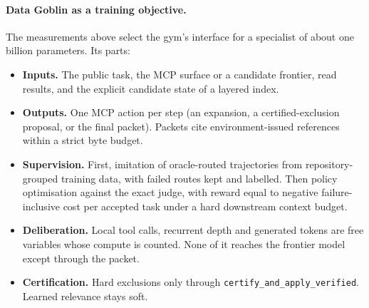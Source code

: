 \paragraph{Data Goblin as a training objective.} The measurements above select the gym's
interface for a specialist of about one billion parameters. Its parts:
\begin{itemize}
\item \textbf{Inputs.} The public task, the MCP surface or a candidate frontier, read results, and the explicit candidate
state of a layered index.
\item \textbf{Outputs.} One MCP action per step (an expansion, a certified-exclusion proposal, or the final packet). Packets cite
environment-issued references within a strict byte budget.
\item \textbf{Supervision.} First, imitation of oracle-routed trajectories from repository-grouped training data, with failed routes
kept and labelled. Then policy optimisation against the exact judge, with reward equal to negative failure-inclusive
cost per accepted task under a hard downstream context budget.
\item \textbf{Deliberation.} Local tool calls, recurrent depth and generated tokens are free variables whose compute is
counted. None of it reaches the frontier model except through the packet.
\item \textbf{Certification.} Hard exclusions only through \texttt{certify\_and\_apply\_verified}. Learned relevance stays soft.
\end{itemize}


